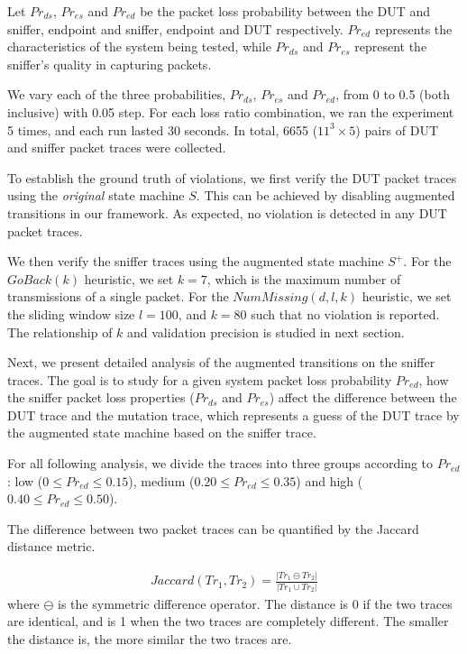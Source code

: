 Let $Pr_{ds}$, $Pr_{es}$ and $Pr_{ed}$ be the packet loss probability between
the DUT and sniffer, endpoint and sniffer, endpoint and DUT respectively.
$Pr_{ed}$ represents the characteristics of the system being tested, while
$Pr_{ds}$ and $Pr_{es}$ represent the sniffer's quality in capturing packets.



We vary each of the three probabilities, $Pr_{ds}$, $Pr_{es}$ and $Pr_{ed}$, from
0 to 0.5 (both inclusive) with 0.05 step.  For each loss ratio combination, we
ran the experiment 5 times, and each run lasted
30 seconds. In total, 6655 ($11^3\times 5$) pairs of DUT and sniffer packet
traces were collected.

To establish the ground truth of violations, we first verify the DUT packet
traces using the \textit{original} state machine $S$.  This can be achieved by
disabling augmented transitions in our framework.  As expected, no violation is
detected in any DUT packet traces.

We then verify the sniffer traces using the augmented state machine $S^+$.  For
the $\mathit{GoBack}(k)$ heuristic, we set $k=7$, which is the maximum number of
transmissions of a single packet. For the $\mathit{NumMissing}(d, l, k)$ heuristic, we
set the sliding window size $l=100$, and $k=80$ such that no violation is
reported. The relationship of $k$ and validation precision is studied in next
section.

Next, we present detailed analysis of the augmented transitions on the sniffer
traces. The goal is to study for a given system packet loss probability
$Pr_{ed}$, how the sniffer packet loss properties ($Pr_{ds}$ and $Pr_{es}$)
affect the difference between the DUT trace and the mutation trace, which represents
a guess of the DUT trace by the augmented state machine based on the sniffer
trace.

For all following analysis, we divide the traces into three groups according to
$Pr_{ed}$: low ($0 \le Pr_{ed} \le 0.15$), medium ($0.20 \le Pr_{ed} \le 0.35$)
and high ($0.40 \le Pr_{ed} \le 0.50$).

The difference between two packet traces can be quantified by the Jaccard distance
metric.

\begin{align}
  Jaccard(Tr_1, Tr_2) = \frac{\left\vert Tr_1 \ominus Tr_2\right\vert}{\left\vert
  Tr_1 \cup Tr_2\right\vert}
\end{align}%
where $\ominus$ is the symmetric difference operator.  The distance is 0 if the
two traces are identical, and is 1 when the two traces are completely different.
The smaller the distance is, the more similar the two traces are.

